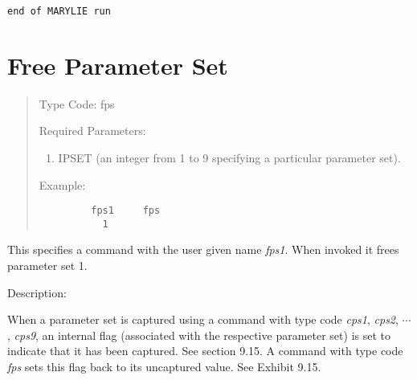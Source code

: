 \begin{footnotesize}
\begin{verbatim}
end of MARYLIE run
\end{verbatim}
\end{footnotesize}

\newpage
\section{Free Parameter Set} 
\begin{quotation}
\noindent     Type Code:  fps
\vspace{5mm}

\noindent Required Parameters:
\begin{enumerate}
       \item  IPSET (an integer from 1 to 9 specifying a particular
              parameter set).
\end{enumerate}

\vspace{5mm}
\noindent Example:
\begin{verbatim}
         fps1     fps
           1
\end{verbatim}
\end{quotation}
This specifies a command with the user given name {\em fps1}.  When invoked it frees parameter set 1.

\vspace{5mm}
     Description:
\vspace{2mm}

When a parameter set is captured using a command with type code {\em cps1}, {\em cps2}, $\cdots$, {\em cps9}, an internal flag (associated with the respective parameter set) is set to indicate that it has been captured.  See section 9.15.  A command with type code {\em fps} sets this flag back to its uncaptured value.  See Exhibit 9.15.

\newpage
